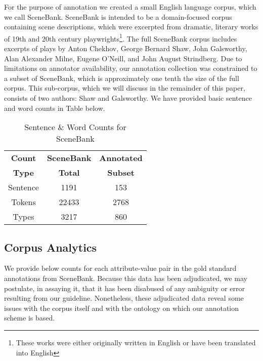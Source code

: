 \documentclass[11pt]{article}
\begin{document}
For the purpose of annotation we created a small English language corpus, which we call SceneBank. SceneBank is intended to be a domain-focused corpus containing scene descriptions, which were excerpted from dramatic, literary works of 19th and 20th century playwrights\footnote{These works were either originally written in English or have been translated into English}. The full SceneBank corpus includes excerpts of plays by Anton Chekhov, George Bernard Shaw, John Galsworthy, Alan Alexander Milne, Eugene O'Neill, and John August Strindberg. Due to limitations on annotator availability, our annotation collection was constrained to a subset of SceneBank, which is approximately one tenth the size of the full corpus. This sub-corpus, which we will discuss in the remainder of this paper, consists of two authors: Shaw and Galsworthy. We have provided basic sentence and word counts in Table  below.

\begin{table}[h]
\begin{center}
\begin{tabular}
    {|c|c|c|}
    \hline \textbf{Count} & \textbf{SceneBank} & \textbf{Annotated}           \\
           \textbf{Type}  & \textbf{Total}     & \textbf{Subset}              \\
    \hline Sentence       & 1191               & 153                     \\
    \hline Tokens         & 22433              & 2768                    \\
    \hline Types          & 3217               & 860                     \\
    \hline
\end{tabular}
\caption{Sentence \& Word Counts for SceneBank}
\label{tab:sent-word-counts}
\end{center}
\end{table}


\subsection{Corpus Analytics} %
\label{sub:corpus_analysis}
We provide below counts for each attribute-value pair in the gold standard annotations from SceneBank. Because this data has been adjudicated, we may postulate, in assaying it, that it has been disabused of any ambiguity or error resulting from our guideline. Nonetheless, these adjudicated data reveal some issues with the corpus itself and with the ontology on which our annotation scheme is based.
\end{document}
